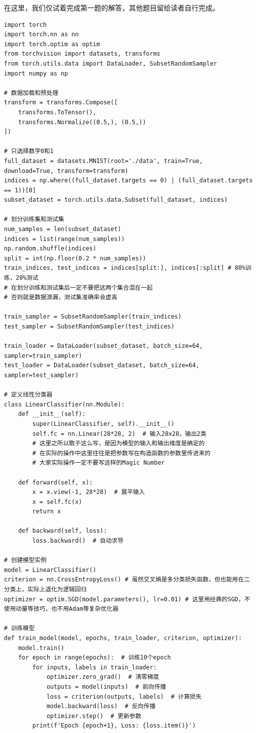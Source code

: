 \begin{answer}
在这里，我们仅试着完成第一题的解答，其他题目留给读者自行完成。

\begin{verbatim}
import torch
import torch.nn as nn
import torch.optim as optim
from torchvision import datasets, transforms
from torch.utils.data import DataLoader, SubsetRandomSampler
import numpy as np

# 数据加载和预处理
transform = transforms.Compose([
    transforms.ToTensor(),
    transforms.Normalize((0.5,), (0.5,))
])

# 只选择数字0和1
full_dataset = datasets.MNIST(root='./data', train=True, download=True, transform=transform)
indices = np.where((full_dataset.targets == 0) | (full_dataset.targets == 1))[0]
subset_dataset = torch.utils.data.Subset(full_dataset, indices)

# 划分训练集和测试集
num_samples = len(subset_dataset)
indices = list(range(num_samples))
np.random.shuffle(indices)
split = int(np.floor(0.2 * num_samples))
train_indices, test_indices = indices[split:], indices[:split] # 80%训练，20%测试
# 在划分训练和测试集后一定不要把这两个集合混在一起
# 否则就是数据泄漏，测试集准确率会虚高

train_sampler = SubsetRandomSampler(train_indices)
test_sampler = SubsetRandomSampler(test_indices)

train_loader = DataLoader(subset_dataset, batch_size=64, sampler=train_sampler)
test_loader = DataLoader(subset_dataset, batch_size=64, sampler=test_sampler)

# 定义线性分类器
class LinearClassifier(nn.Module):
    def __init__(self):
        super(LinearClassifier, self).__init__()
        self.fc = nn.Linear(28*28, 2)  # 输入28x28，输出2类
        # 这里之所以敢于这么写，是因为模型的输入和输出维度是确定的
        # 在实际的操作中这里往往是把参数写在构造函数的参数里传进来的
        # 大家实际操作一定不要写这样的Magic Number

    def forward(self, x):
        x = x.view(-1, 28*28)  # 展平输入
        x = self.fc(x)
        return x
    
    def backward(self, loss):
        loss.backward()  # 自动求导
    
# 创建模型实例
model = LinearClassifier()
criterion = nn.CrossEntropyLoss() # 虽然交叉熵是多分类损失函数，但也能用在二分类上，实际上退化为逻辑回归
optimizer = optim.SGD(model.parameters(), lr=0.01) # 这里用经典的SGD，不使用动量等技巧，也不用Adam等复杂优化器

# 训练模型
def train_model(model, epochs, train_loader, criterion, optimizer):
    model.train()
    for epoch in range(epochs):  # 训练10个epoch
        for inputs, labels in train_loader:
            optimizer.zero_grad()  # 清零梯度
            outputs = model(inputs)  # 前向传播
            loss = criterion(outputs, labels)  # 计算损失
            model.backward(loss)  # 反向传播
            optimizer.step()  # 更新参数
        print(f'Epoch {epoch+1}, Loss: {loss.item()}')


\end{verbatim}
\end{answer}
